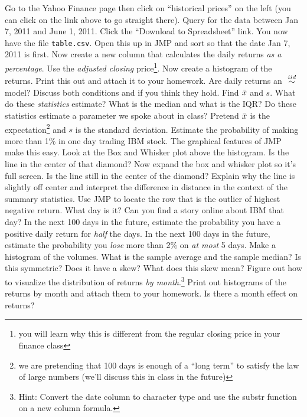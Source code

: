 \documentclass[12pt]{article}
\begin{document}
\begin{enumerate}
\easysubproblem Go to the Yahoo Finance page  then click on ``historical prices'' on the left (you can click on the link above to go straight there). Query for the data between Jan 7, 2011 and June 1, 2011. Click the ``Download to Spreadsheet'' link. You now have the file \texttt{table.csv}. Open this up in JMP and sort so that the date Jan 7, 2011 is first. Now create a new column that calculates the daily returns \textit{as a percentage}. Use the \textit{adjusted closing} price\footnote{you will learn why this is different from the regular closing price in your finance class}. Now create a histogram of the returns. Print this out and attach it to your homework.
\easysubproblem Are daily returns an $\iid$ model? Discuss both conditions and if you think they hold.
\easysubproblem Find $\bar{x}$ and $s$. What do these \textit{statistics} estimate?
\easysubproblem What is the median and what is the IQR? Do these statistics estimate a parameter we spoke about in class?
\easysubproblem Pretend $\bar{x}$ is the expectation\footnote{we are pretending that 100 days is enough of a ``long term'' to satisfy the law of large numbers (we'll discuss this in class in the future)} and $s$ is the standard deviation. Estimate the probability of making more than 1\% in one day trading IBM stock. The graphical features of JMP make this easy.
\intermediatesubproblem Look at the Box and Whisker plot above the histogram. Is the line in the center of that diamond? Now expand the box and whisker plot so it's full screen. Is the line still in the center of the diamond? Explain why the line is slightly off center and interpret the difference in distance in the context of the summary statistics.
\intermediatesubproblem Use JMP to locate the row that is the outlier of highest negative return. What day is it? Can you find a story online about IBM that day?
\hardsubproblem In the next 100 days in the future, estimate the probability you have a positive daily return for \textit{half} the days.
\hardsubproblem In the next 100 days in the future, estimate the probability you \textit{lose} more than 2\% on \textit{at most} 5 days.
\easysubproblem Make a histogram of the volumes. What is the sample average and the sample median? Is this symmetric? Does it have a skew? What does this skew mean?
\extracreditsubproblem Figure out how to visualize the distribution of returns \textit{by month}.\footnote{Hint: Convert the date column to character type and use the substr function on a new column formula.} Print out histograms of the returns by month and attach them to your homework. Is there a month effect on returns?
\end{enumerate}
\end{document}
